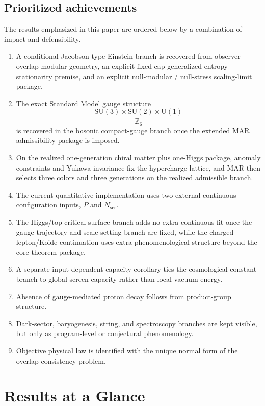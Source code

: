 \documentclass[11pt]{article}
\newcommand{\SU}{\mathrm{SU}}
\newcommand{\U}{\mathrm{U}}
\begin{document}
\subsection*{Prioritized achievements}

The results emphasized in this paper are ordered below by a combination of impact and defensibility.

\begin{enumerate}[leftmargin=2em]
\item A conditional Jacobson-type Einstein branch is recovered from observer-overlap modular geometry, an explicit fixed-cap generalized-entropy stationarity premise, and an explicit null-modular / null-stress scaling-limit package.
\item The exact Standard Model gauge structure
\[
\frac{\SU(3)\times\SU(2)\times\U(1)}{\mathbb Z_6}
\]
is recovered in the bosonic compact-gauge branch once the extended MAR admissibility package is imposed.
\item On the realized one-generation chiral matter plus one-Higgs package, anomaly constraints and Yukawa invariance fix the hypercharge lattice, and MAR then selects three colors and three generations on the realized admissible branch.
\item The current quantitative implementation uses two external continuous configuration inputs, $P$ and $N_{\mathrm{scr}}$.
\item The Higgs/top critical-surface branch adds no extra continuous fit once the gauge trajectory and scale-setting branch are fixed, while the charged-lepton/Koide continuation uses extra phenomenological structure beyond the core theorem package.
\item A separate input-dependent capacity corollary ties the cosmological-constant branch to global screen capacity rather than local vacuum energy.
\item Absence of gauge-mediated proton decay follows from product-group structure.
\item Dark-sector, baryogenesis, string, and spectroscopy branches are kept visible, but only as program-level or conjectural phenomenology.
\item Objective physical law is identified with the unique normal form of the overlap-consistency problem.
\end{enumerate}

\section{Results at a Glance}
\end{document}
